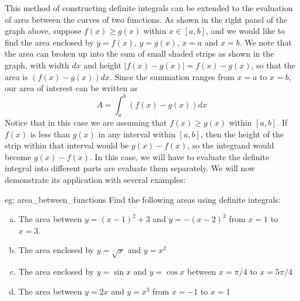 This method of constructing definite integrals can be extended to the evaluation of area between the curves of two functions.  As shown in the right panel of the graph above, suppose $f(x) \ge g(x)$ within $x \in [a,b]$, and we would like to find the area enclosed by $y = f(x)$, $y = g(x)$, $x=a$ and $x=b$.  We note that the area can broken up into the sum of small shaded strips as shown in the graph, with width $dx$ and height $|f(x)-g(x)| = f(x) - g(x)$, so that the area is $(f(x)-g(x))dx$.  Since the summation ranges from $x=a$ to $x=b$, our area of interest can be written as
\[A = \int_a^b (f(x)-g(x))dx\]
Notice that in this case we are assuming that $f(x) \ge g(x)$ within $[a, b]$.  If $f(x)$ is less than $g(x)$ in any interval within $[a,b]$, then the height of the strip within that interval would be $g(x)-f(x)$, so the integrand would become $g(x)-f(x)$.  In this case, we will have to evaluate the definite integral into different parts are evaluate them separately.  We will now demonstrate its application with several examples:

\begin{eg}[]{eg: area_between_functions}
    Find the following areas using definite integrals:
    \begin{enumerate}[a)]
        \item The area between $y = (x-1)^2 + 3$ and $y = -(x-2)^2$ from $x = 1$ to $x = 3$.
        \item The area enclosed by $y = \sqrt{x}$ and $y = x^2$
        \item The area enclosed by $y = \sin x$ and $y = \cos x$ between $x = \pi/4$ to $x = 5\pi/4$
        \item The area between $y = 2x$ and $y = x^3$ from $x = -1$ to $x = 1$
    \end{enumerate}
\end{eg}

